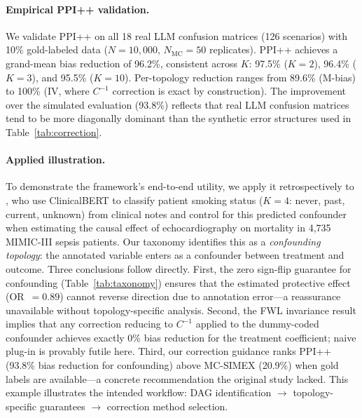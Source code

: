 \paragraph{Empirical PPI++ validation.}
We validate PPI++ on all 18 real LLM confusion matrices (126 scenarios) with 10\% gold-labeled data ($N{=}10{,}000$, $N_{\text{MC}}{=}50$ replicates). PPI++ achieves a grand-mean bias reduction of 96.2\%, consistent across $K$: 97.5\% ($K{=}2$), 96.4\% ($K{=}3$), and 95.5\% ($K{=}10$). Per-topology reduction ranges from 89.6\% (M-bias) to 100\% (IV, where $C^{-1}$ correction is exact by construction). The improvement over the simulated evaluation (93.8\%) reflects that real LLM confusion matrices tend to be more diagonally dominant than the synthetic error structures used in Table~\ref{tab:correction}.

\paragraph{Applied illustration.}
To demonstrate the framework's end-to-end utility, we apply it retrospectively to \citet{lee_wood_doughty2024}, who use ClinicalBERT to classify patient smoking status ($K{=}4$: never, past, current, unknown) from clinical notes and control for this predicted confounder when estimating the causal effect of echocardiography on mortality in 4{,}735 MIMIC-III sepsis patients.
Our taxonomy identifies this as a \emph{confounding topology}: the annotated variable enters as a confounder between treatment and outcome.
Three conclusions follow directly.
First, the zero sign-flip guarantee for confounding (Table~\ref{tab:taxonomy}) ensures that the estimated protective effect (OR~$= 0.89$) cannot reverse direction due to annotation error---a reassurance unavailable without topology-specific analysis.
Second, the FWL invariance result implies that any correction reducing to $C^{-1}$ applied to the dummy-coded confounder achieves exactly 0\% bias reduction for the treatment coefficient; naive plug-in is provably futile here.
Third, our correction guidance ranks PPI++ (93.8\% bias reduction for confounding) above MC-SIMEX (20.9\%) when gold labels are available---a concrete recommendation the original study lacked.
This example illustrates the intended workflow: DAG identification $\to$ topology-specific guarantees $\to$ correction method selection.
